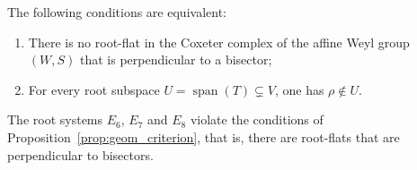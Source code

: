 \documentclass[10pt,a4paper]{amsart}
\DeclareMathOperator{\Span}{span}
\begin{document}
	\begin{prop}\label{prop:geom_criterion}
		The following conditions are equivalent: 
		\begin{enumerate}
			\item There is no root-flat in the Coxeter complex of the affine Weyl group $(W,S)$ that is perpendicular to a bisector; 
			\item For every root subspace \(U=\Span(T)\subsetneq V\), one has \(\rho\notin U\).
		\end{enumerate}
		
	\end{prop}

	\begin{prop}
		\label{prop:E678}
		The root systems  \(E_6\), \(E_7\) and \(E_8\) violate the conditions of
		Proposition~\ref{prop:geom_criterion}, that is, there are root-flats that are perpendicular to bisectors.
	\end{prop}
\end{document}
